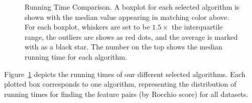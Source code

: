 \begin{figure}[h]
\centering %
\vspace{-5mm}
\vspace{-5mm}
\caption{Running Time Comparison. A boxplot for each selected algorithm is shown with the median value appearing in matching color above. For each boxplot, whiskers are set to be $1.5\times$ the interquartile range, the outliers are shows as red dots, and the average is marked with as a black star. The number on the top shows the median running time for each algorithm.}
\vspace{-5mm}
\label{fig:time}
\end{figure}

 Figure~\ref{fig:time} depicts the running times of our different selected algorithms. Each plotted box corresponds to one algorithm, representing the distribution of running times for finding the \topk feature pairs (by Rocchio score) for all datasets.

